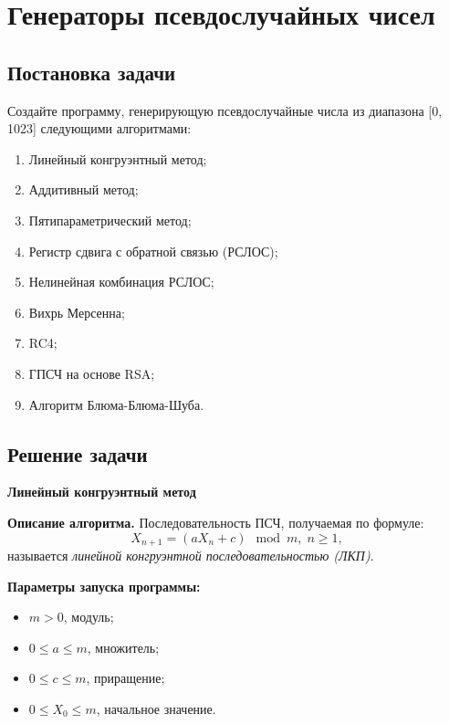 \documentclass[spec, och, labwork]{shiza}
\begin{document}
\tableofcontents

\section{Генераторы псевдослучайных чисел}
\subsection{Постановка задачи}

Создайте программу, генерирующую псевдослучайные числа из диапазона [0, 1023] следующими алгоритмами:
\begin{enumerate}
  \item Линейный конгруэнтный метод;
  \item Аддитивный метод;
  \item Пятипараметрический метод;
  \item Регистр сдвига с обратной связью (РСЛОС);
  \item Нелинейная комбинация РСЛОС;
  \item Вихрь Мерсенна;
  \item RC4;
  \item ГПСЧ на основе RSA;
  \item Алгоритм Блюма-Блюма-Шуба.
\end{enumerate}

\subsection{Решение задачи}
\begin{center}
  \textbf{Линейный конгруэнтный метод}
\end{center}
\textbf{Описание алгоритма.} Последовательность ПСЧ, получаемая по формуле:
\begin{equation}
  X_{n + 1} = (aX_n + c) \mod m, \; n \geq 1,
\end{equation}
называется \textit{линейной конгруэнтной последовательностью (ЛКП)}.

\textbf{Параметры запуска программы:}
\begin{itemize}
  \item $m > 0$, модуль;
  \item $0 \leq a \leq m$, множитель;
  \item $0 \leq c \leq m$, приращение;
  \item $0 \leq X_0 \leq m$, начальное значение.
\end{itemize}
\end{document}
